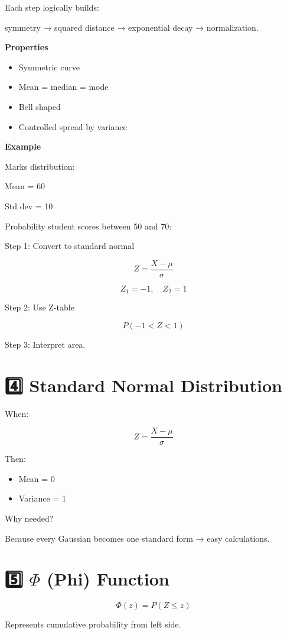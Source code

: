 \documentclass[12pt,a4paper]{article}
\begin{document}
Each step logically builds:

symmetry → squared distance → exponential decay → normalization.

\textbf{Properties}

\begin{itemize}
\item Symmetric curve
\item Mean = median = mode
\item Bell shaped
\item Controlled spread by variance
\end{itemize}

\textbf{Example}

Marks distribution:

Mean = 60

Std dev = 10

Probability student scores between 50 and 70:

Step 1: Convert to standard normal

\[
Z = \frac{X - \mu}{\sigma}
\]

\[
Z_1 = -1, \quad Z_2 = 1
\]

Step 2: Use Z-table

\[
P(-1 < Z < 1)
\]

Step 3: Interpret area.

\section*{4️⃣ Standard Normal Distribution}

When:

\[
Z = \frac{X - \mu}{\sigma}
\]

Then:

\begin{itemize}
\item Mean = 0
\item Variance = 1
\end{itemize}

Why needed?

Because every Gaussian becomes one standard form → easy calculations.

\section*{5️⃣ $\Phi$ (Phi) Function}

\[
\Phi(z) = P(Z \le z)
\]

Represents cumulative probability from left side.
\end{document}
